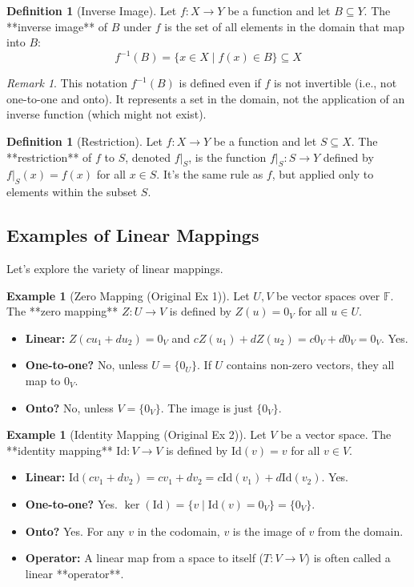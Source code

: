 \documentclass[11pt]{article}
\theoremstyle{definition}
\newtheorem{definition}[theorem]{Definition}
\newtheorem{example}[theorem]{Example}
\theoremstyle{remark}
\newtheorem{remark}[theorem]{Remark}
\newcommand{\F}{\mathbb{F}}
\newcommand{\id}{\mathrm{Id}}
\begin{document}
\begin{definition}[Inverse Image]
    Let $f: X \to Y$ be a function and let $B \subseteq Y$. The **inverse image** of $B$ under $f$ is the set of all elements in the domain that map into $B$:
    \[ f^{-1}(B) = \{x \in X \mid f(x) \in B\} \subseteq X \]
\end{definition}
\begin{remark}
    This notation $f^{-1}(B)$ is defined even if $f$ is not invertible (i.e., not one-to-one and onto). It represents a set in the domain, not the application of an inverse function (which might not exist).
\end{remark}

\begin{definition}[Restriction]
    Let $f: X \to Y$ be a function and let $S \subseteq X$. The **restriction** of $f$ to $S$, denoted $f|_S$, is the function $f|_S: S \to Y$ defined by $f|_S(x) = f(x)$ for all $x \in S$. It's the same rule as $f$, but applied only to elements within the subset $S$.
\end{definition}

\subsection{Examples of Linear Mappings}

Let's explore the variety of linear mappings.

\begin{example}[Zero Mapping (Original Ex 1)]
    Let $U, V$ be vector spaces over $\F$. The **zero mapping** $Z: U \to V$ is defined by $Z(u) = 0_V$ for all $u \in U$.
    \begin{itemize}
        \item \textbf{Linear:} $Z(c u_1 + d u_2) = 0_V$ and $c Z(u_1) + d Z(u_2) = c 0_V + d 0_V = 0_V$. Yes.
        \item \textbf{One-to-one?} No, unless $U = \{0_U\}$. If $U$ contains non-zero vectors, they all map to $0_V$.
        \item \textbf{Onto?} No, unless $V = \{0_V\}$. The image is just $\{0_V\}$.
    \end{itemize}
\end{example}

\begin{example}[Identity Mapping (Original Ex 2)]
    Let $V$ be a vector space. The **identity mapping** $\id: V \to V$ is defined by $\id(v) = v$ for all $v \in V$.
    \begin{itemize}
        \item \textbf{Linear:} $\id(c v_1 + d v_2) = c v_1 + d v_2 = c \id(v_1) + d \id(v_2)$. Yes.
        \item \textbf{One-to-one?} Yes. $\ker(\id) = \{v \mid \id(v) = 0_V\} = \{0_V\}$.
        \item \textbf{Onto?} Yes. For any $v$ in the codomain, $v$ is the image of $v$ from the domain.
        \item \textbf{Operator:} A linear map from a space to itself ($T: V \to V$) is often called a linear **operator**.
    \end{itemize}
\end{example}
\end{document}
